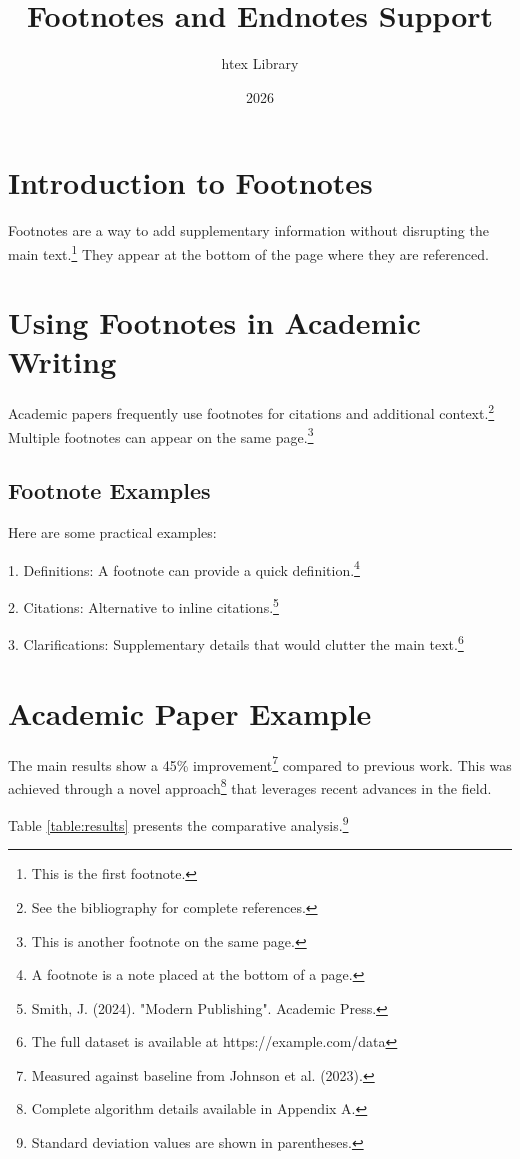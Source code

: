 \documentclass{article}
\title{Footnotes and Endnotes Support}
\author{htex Library}
\date{2026}
\begin{document}
\maketitle

\section{Introduction to Footnotes}

Footnotes are a way to add supplementary information without disrupting the main text.\footnote{This is the first footnote.} They appear at the bottom of the page where they are referenced.

\section{Using Footnotes in Academic Writing}

Academic papers frequently use footnotes for citations and additional context.\footnote{See the bibliography for complete references.} Multiple footnotes can appear on the same page.\footnote{This is another footnote on the same page.}

\subsection{Footnote Examples}

Here are some practical examples:

1. Definitions: A footnote can provide a quick definition.\footnote{A footnote is a note placed at the bottom of a page.}

2. Citations: Alternative to inline citations.\footnote{Smith, J. (2024). "Modern Publishing". Academic Press.}

3. Clarifications: Supplementary details that would clutter the main text.\footnote{The full dataset is available at https://example.com/data}

\section{Academic Paper Example}

The main results show a 45\% improvement\footnote{Measured against baseline from Johnson et al. (2023).} compared to previous work. This was achieved through a novel approach\footnote{Complete algorithm details available in Appendix A.} that leverages recent advances in the field.

Table \ref{table:results} presents the comparative analysis.\footnote{Standard deviation values are shown in parentheses.}
\end{document}
